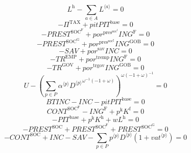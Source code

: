 \begin{equation}
L^{\mathrm{h}} - \sum_{a\in A} {L}^{\langle a\rangle} = 0
\end{equation}
\begin{equation}
-\Pi^{\mathrm{TAX}} + {{p\!i\!t}} {{P\!I\!T}^{\mathrm{base}}} = 0
\end{equation}
\begin{equation}
-{P\!R\!E\!S\!T}^{\mathrm{SOC}^{\mathrm{F}}} + {{p\!o\!r}^{\mathrm{pres}^{\mathrm{soc}^{\mathrm{f}}}}} {{I\!N\!G}^{\mathrm{F}}} = 0
\end{equation}
\begin{equation}
-{P\!R\!E\!S\!T}^{\mathrm{SOC}^{\mathrm{G}}} + {{p\!o\!r}^{\mathrm{pres}^{\mathrm{soc}^{\mathrm{g}}}}} {{I\!N\!G}^{\mathrm{GOB}}} = 0
\end{equation}
\begin{equation}
-{S\!A\!V} + {{p\!o\!r}^{\mathrm{sav}}} {{I\!N\!C}} = 0
\end{equation}
\begin{equation}
-{T\!R}^{\mathrm{EMP}} + {{p\!o\!r}^{\mathrm{tremp}}} {{I\!N\!G}^{\mathrm{F}}} = 0
\end{equation}
\begin{equation}
-{T\!R}^{\mathrm{GOV}} + {{p\!o\!r}^{\mathrm{trgov}}} {{I\!N\!G}^{\mathrm{GOB}}} = 0
\end{equation}
\begin{equation}
U - \left(\sum_{p\in P} {{\alpha}^{\langle p\rangle}} {{{D}^{\langle p\rangle}}^{{\omega}^{-1} \left(-1 + \omega\right)}}\right)^{{\omega} \left(-1 + \omega\right)^{-1}} = 0
\end{equation}
\begin{equation}
{B\!T\!I\!N\!C} - {I\!N\!C} - {{p\!i\!t}} {{P\!I\!T}^{\mathrm{base}}} = 0
\end{equation}
\begin{equation}
{C\!O\!N\!T}^{\mathrm{SOC}^{\mathrm{F}}} - {I\!N\!G}^{\mathrm{F}} + {p^{\mathrm{k}}} {K^{\mathrm{f}}} = 0
\end{equation}
\begin{equation}
-{P\!I\!T}^{\mathrm{base}} + {p^{\mathrm{k}}} {K^{\mathrm{h}}} + {w} {L^{\mathrm{h}}} = 0
\end{equation}
\begin{equation}
-{P\!R\!E\!S\!T}^{\mathrm{SOC}} + {P\!R\!E\!S\!T}^{\mathrm{SOC}^{\mathrm{F}}} + {P\!R\!E\!S\!T}^{\mathrm{SOC}^{\mathrm{G}}} = 0
\end{equation}
\begin{equation}
-{C\!O\!N\!T}^{\mathrm{SOC}} + {I\!N\!C} - {S\!A\!V} - \sum_{p\in P} {{p}^{\langle p\rangle}} {{D}^{\langle p\rangle}} \left(1 + {{v\!a\!t}}^{\langle p\rangle}\right) = 0
\end{equation}
